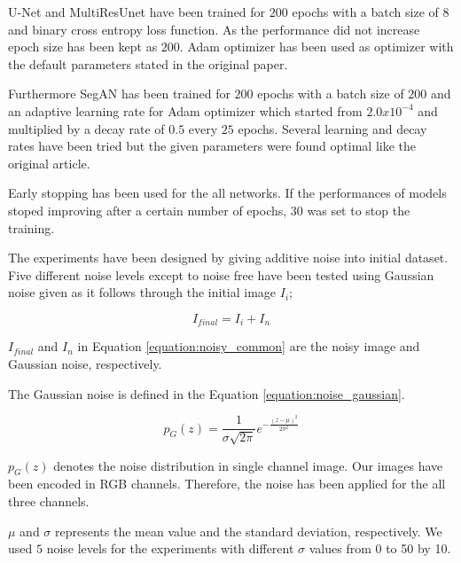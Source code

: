     U-Net and MultiResUnet have been trained for $200$ epochs with a batch size of $8$ and
    binary cross entropy loss function. As the performance did not increase epoch size has been kept as $200$.
    Adam optimizer has been used as optimizer with the default parameters stated in the original paper.

    Furthermore SegAN has been trained for $200$ epochs with a batch size of $200$ and an adaptive learning
    rate for Adam optimizer which started from $2.0 x 10^{-4}$ and multiplied by a decay rate of
    $0.5$ every $25$ epochs. Several learning and decay rates have been tried but the given parameters were found optimal like the original article.

    Early stopping has been used for the all networks.
    If the performances of models stoped improving after a certain number of epochs, $30$ was set to stop the training.

    The experiments have been designed by giving additive noise into initial dataset.
    Five different noise levels except to noise free have been tested using Gaussian noise given as it follows through the
    initial image $I_i$;

    \begin{equation}
        I_{final} = I_i + I_n \label{equation:noisy_common}
    \end{equation}

    $I_{final}$ and $I_{n}$ in Equation \eqref{equation:noisy_common} are the noisy image and Gaussian noise, respectively.

    The Gaussian noise is defined in the Equation  \eqref{equation:noise_gaussian}.

    \begin{equation}
        p_G(z) = \frac{1}{\sigma\sqrt{2\pi}} e^{ -\frac{(z-\mu)^2}{2\sigma^2} }  \label{equation:noise_gaussian}
    \end{equation}

    $p_G(z)$ denotes the noise distribution in single channel image.
    Our images have been encoded in RGB channels. Therefore, the noise has been applied for the all three channels.

    $\mu$ and $\sigma$ represents the mean value and the standard deviation, respectively.
    We used $5$ noise levels for the experiments with different $\sigma$ values from 0 to 50 by 10.